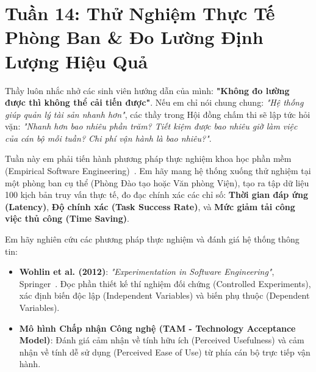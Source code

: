 ﻿\section{Tuần 14: Thử Nghiệm Thực Tế Phòng Ban \& Đo Lường Định Lượng Hiệu Quả}
\label{sec:tuan_14}

\begin{advisorbox}
Thầy luôn nhắc nhở các sinh viên hướng dẫn của mình: \textbf{"Không đo lường được thì không thể cải tiến được"}. Nếu em chỉ nói chung chung: \textit{"Hệ thống giúp quản lý tài sản nhanh hơn"}, các thầy trong Hội đồng chấm thi sẽ lập tức hỏi vặn: \textit{"Nhanh hơn bao nhiêu phần trăm? Tiết kiệm được bao nhiêu giờ làm việc của cán bộ mỗi tuần? Chi phí vận hành là bao nhiêu?"}.

Tuần này em phải tiến hành phương pháp thực nghiệm khoa học phần mềm (Empirical Software Engineering)~\cite{wohlin2012experimentation}. Em hãy mang hệ thống xuống thử nghiệm tại một phòng ban cụ thể (Phòng Đào tạo hoặc Văn phòng Viện), tạo ra tập dữ liệu 100 kịch bản truy vấn thực tế, đo đạc chính xác các chỉ số: \textbf{Thời gian đáp ứng (Latency)}, \textbf{Độ chính xác (Task Success Rate)}, và \textbf{Mức giảm tải công việc thủ công (Time Saving)}.
\end{advisorbox}

\begin{literaturebox}
Em hãy nghiên cứu các phương pháp thực nghiệm và đánh giá hệ thống thông tin:
\begin{itemize}[leftmargin=1.5em]
    \item \textbf{Wohlin et al. (2012)}: \textit{"Experimentation in Software Engineering"}, Springer~\cite{wohlin2012experimentation}. Đọc phần thiết kế thí nghiệm đối chứng (Controlled Experiments), xác định biến độc lập (Independent Variables) và biến phụ thuộc (Dependent Variables).
    \item \textbf{Mô hình Chấp nhận Công nghệ (TAM - Technology Acceptance Model)}: Đánh giá cảm nhận về tính hữu ích (Perceived Usefulness) và cảm nhận về tính dễ sử dụng (Perceived Ease of Use) từ phía cán bộ trực tiếp vận hành.
\end{itemize}
\end{literaturebox}


